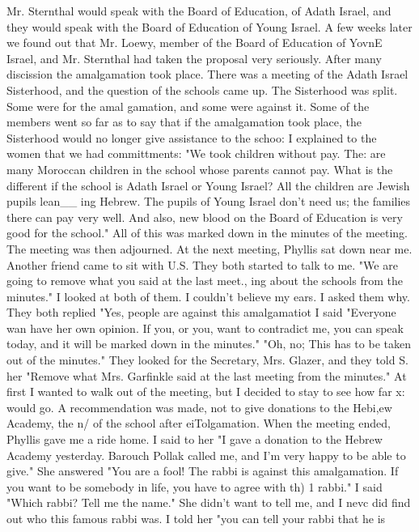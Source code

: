 {Mr.
Sternthal would speak with the Board of Education, of Adath Israel, and they would 
speak with the Board of Education of Young Israel.
A few weeks later we found out that Mr.
Loewy, member of the Board of Education of YovnE 
Israel, and Mr.
Sternthal had taken the proposal very seriously.
After many discission 
the amalgamation took place.
There was a meeting of the Adath Israel Sisterhood, and 
the question of the schools came up.
The Sisterhood was split.
Some were for the amal 
gamation, and some were against it.
Some of the members went so far as to say that if 
the amalgamation took place, the Sisterhood would no longer give assistance to the schoo: 
I explained to the women that we had committments: "We took children without pay.
The: 
are many Moroccan children in the school whose parents cannot pay.
What is the different 
if the school is Adath Israel or Young Israel?
All the children are Jewish pupils lean__ 
ing Hebrew.
The pupils of Young Israel don't need us; the families there can pay very 
well.
And also, new blood on the Board of Education is very good for the school."
All 
of this was marked down in the minutes of the meeting.
The meeting was then adjourned.
At the next meeting, Phyllis sat down near me.
Another friend came to sit with U.S.
They both started to talk to me.
"We are going to remove what you said at the last meet., 
ing about the schools from the minutes."
I looked at both of them.
I couldn't believe 
my ears.
I asked them why.
They both replied "Yes, people are against this amalgamatiot 
I said "Everyone wan have her own opinion.
If you, or you, want to contradict me, you 
can speak today, and it will be marked down in the minutes."
"Oh, no; This has to be 
taken out of the minutes."
They looked for the Secretary, Mrs.
Glazer, and they told 
S. 
her "Remove what Mrs.
Garfinkle said at the last meeting from the minutes."
At first I wanted to walk out of the meeting, but I decided to stay to see how far x: 
would go.
A recommendation was made, not to give donations to the Hebi,ew Academy, the n/ 
of the school after eiTolgamation.
When the meeting ended, Phyllis gave me a ride home.
I said to her "I gave a donation to the Hebrew Academy yesterday.
Barouch Pollak called 
me, and I'm very happy to be able to give."
She answered "You are a fool!
The rabbi is 
against this amalgamation.
If you want to be somebody in life, you have to agree with th) 
1 
rabbi."
I said "Which rabbi?
Tell me the name."
She didn't want to tell me, and I nevc 
did find out who this famous rabbi was.
I told her "you can tell your rabbi that he is 
}

